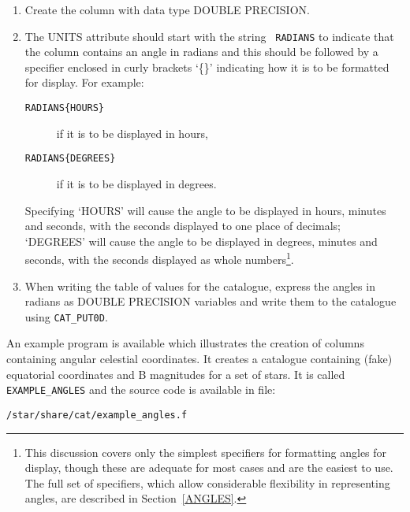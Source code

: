 \begin{enumerate}

  \item Create the column with data type DOUBLE PRECISION.

  \item The UNITS attribute should start with the string {\tt 
   RADIANS} to indicate that the column contains an angle in 
   radians and this should be followed by a specifier enclosed in 
   curly brackets `\{\}' indicating how it is to be formatted for 
   display. For example:

  \begin{description}

    \item[{\tt RADIANS\{HOURS\} }] if it is to be displayed in 
     hours,

    \item[{\tt RADIANS\{DEGREES\} }] if it is to be displayed in 
     degrees.

  \end{description}

   Specifying `HOURS' will cause the angle to be displayed in 
   hours, minutes and seconds, with the seconds displayed to one 
   place of decimals; `DEGREES' will cause the angle to be 
   displayed in degrees, minutes and seconds, with the seconds 
   displayed as whole numbers\footnote{This discussion covers only 
   the simplest specifiers for formatting angles for display, 
   though these are adequate for most cases and are the easiest to 
   use. The full set of specifiers, which allow considerable 
   flexibility in representing angles, are described in 
   Section~\ref{ANGLES}.}.

  \item When writing the table of values for the catalogue, 
   express the angles in radians as DOUBLE PRECISION variables and 
   write them to the catalogue using {\tt CAT\_PUT0D}.

\end{enumerate}

An example program is available which illustrates the creation 
of columns containing angular celestial coordinates. It creates 
a catalogue containing (fake) equatorial coordinates and B 
magnitudes for a set of stars. It is called {\tt EXAMPLE\_ANGLES} and
the source code is available in file:

\begin{center}
{\tt /star/share/cat/example\_angles.f}
\end{center}


